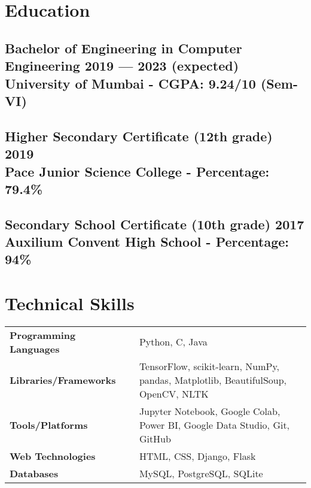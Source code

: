 \documentclass[10pt]{article}
\newcommand{\hskills}[1]{
\textbf{\bfseries #1} }
\begin{document}
\section{Education }
\subsection*{Bachelor of Engineering in Computer Engineering \hfill 2019 ---  2023 (expected) \\ {\normalsize \normalfont University of Mumbai - CGPA: 9.24/10 (Sem-VI) }   } 
\vspace{0.1cm}
\subsection*{Higher Secondary Certificate (12th grade) \hfill  2019 \\ {\normalsize \normalfont Pace Junior Science College - Percentage: 79.4\%}  } 
\vspace{0.1cm}
\subsection*{Secondary School Certificate (10th grade) \hfill 2017\\ {\normalsize \normalfont Auxilium Convent High School -  Percentage: 94\% } \hfill } 
\vspace{0.0cm}


\section{Technical Skills}
\begin{tabular}{p{11em} p{1em} p{43em}}
\hskills{Programming Languages }&  &  Python, C, Java \\
\hskills{Libraries/Frameworks} &  & TensorFlow, scikit-learn, NumPy, pandas, Matplotlib, BeautifulSoup, OpenCV, NLTK \\
\hskills{Tools/Platforms} &  & Jupyter Notebook, Google Colab, Power BI, Google Data Studio, Git, GitHub \\
\hskills{Web Technologies} &  & HTML, CSS, Django, Flask \\
\hskills{Databases} &  & MySQL, PostgreSQL, SQLite \\

\end{tabular}
\vspace{-0.4cm}
\end{document}
